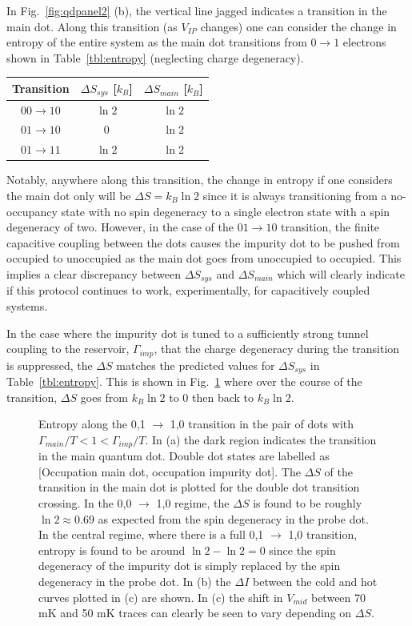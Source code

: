In Fig.~\ref{fig:qdpanel2} (b), the vertical line jagged indicates a transition in the main dot. Along this transition (as $V_{IP}$ changes) one can consider the change in entropy of the entire system as the main dot transitions from $0 \to 1$ electrons shown in Table~\ref{tbl:entropy} (neglecting charge degeneracy).
\begin{center}
	\begin{tabular}{ |c|c|c| } 
		\hline
		Transition & $\Delta S_{sys}$ [$k_B$] & $\Delta S_{main}$ [$k_B$]  \\ \hline\hline
		$00 \to 10$ & $\ln 2$ & $\ln 2$ \\ 
		$01 \to 10$ & 0       & $\ln 2$ \\ 
		$01 \to 11$ & $\ln 2$ & $\ln 2$ \\ 
		\hline
		\end{tabular}
		\label{tbl:entropy}
\end{center}
Notably, anywhere along this transition, the change in entropy if one considers the main dot only will be $\Delta S = k_B \ln 2$ since it is always transitioning from a no-occupancy state with no spin degeneracy to a single electron state with a spin degeneracy of two. However, in the case of the $01 \to 10$ transition, the finite capacitive coupling between the dots causes the impurity dot to be pushed from occupied to unoccupied as the main dot goes from unoccupied to occupied. This implies a clear discrepancy between $\Delta S_{sys}$ and $\Delta S_{main}$ which will clearly indicate if this protocol continues to work, experimentally, for capacitively coupled systems.

In the case where the impurity dot is tuned to a sufficiently strong tunnel coupling to the reservoir, $\Gamma_{imp}$, that the charge degeneracy during the transition is suppressed, the $\Delta S$ matches the predicted values for $\Delta S_{sys}$ in Table~\ref{tbl:entropy}. This is shown in Fig.~\ref{fig:largeg} where over the course of the transition, $\Delta S$ goes from $k_B \ln 2$ to 0 then back to $k_B \ln 2$.
\begin{figure}[h]
\centering
{}
\caption{Entropy along the 0,1 $\to$ 1,0 transition in the pair of dots with $\Gamma_{main}/T < 1 < \Gamma_{imp}/T$. In (a) the dark region indicates the transition in the main quantum dot. Double dot states are labelled as [Occupation main dot, occupation impurity dot]. The $\Delta S$ of the transition in the main dot is plotted for the double dot transition crossing. In the 0,0 $\to$ 1,0 regime, the $\Delta S$ is found to be roughly $\ln 2 \approx 0.69$ as expected from the spin degeneracy in the probe dot. In the central regime, where there is a full 0,1 $\to$ 1,0 transition, entropy is found to be around $\ln 2 - \ln2 = 0$ since the spin degeneracy of the impurity dot is simply replaced by the spin degeneracy in the probe dot. In (b) the $\Delta I$ between the cold and hot curves plotted in (c) are shown. In (c) the shift in $V_{mid}$ between 70 mK and 50 mK traces can clearly be seen to vary depending on $\Delta S$.}
\label{fig:largeg}        
\end{figure}

